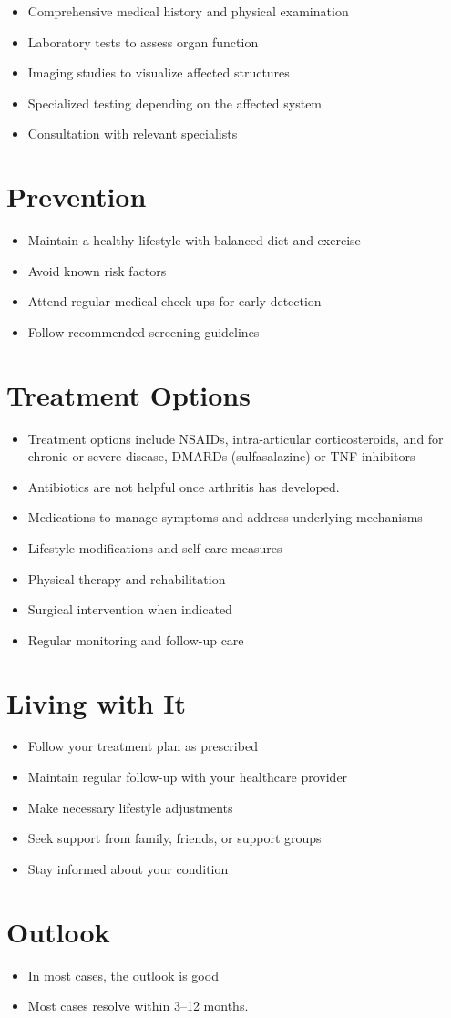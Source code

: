 \begin{itemize}[noitemsep]
  \item Comprehensive medical history and physical examination
  \item Laboratory tests to assess organ function
  \item Imaging studies to visualize affected structures
  \item Specialized testing depending on the affected system
  \item Consultation with relevant specialists
\end{itemize}
\section{Prevention}
\begin{itemize}[noitemsep]
  \item Maintain a healthy lifestyle with balanced diet and exercise
  \item Avoid known risk factors
  \item Attend regular medical check-ups for early detection
  \item Follow recommended screening guidelines
\end{itemize}
\section{Treatment Options}
\begin{itemize}[noitemsep]
  \item Treatment options include NSAIDs, intra-articular corticosteroids, and for chronic or severe disease, DMARDs (sulfasalazine) or TNF inhibitors
  \item Antibiotics are not helpful once arthritis has developed.
  \item Medications to manage symptoms and address underlying mechanisms
  \item Lifestyle modifications and self-care measures
  \item Physical therapy and rehabilitation
  \item Surgical intervention when indicated
  \item Regular monitoring and follow-up care
\end{itemize}
\section{Living with It}
\begin{itemize}[noitemsep]
  \item Follow your treatment plan as prescribed
  \item Maintain regular follow-up with your healthcare provider
  \item Make necessary lifestyle adjustments
  \item Seek support from family, friends, or support groups
  \item Stay informed about your condition
\end{itemize}
\section{Outlook}
\begin{itemize}[noitemsep]
  \item In most cases, the outlook is good
  \item Most cases resolve within 3--12 months.
\end{itemize}
